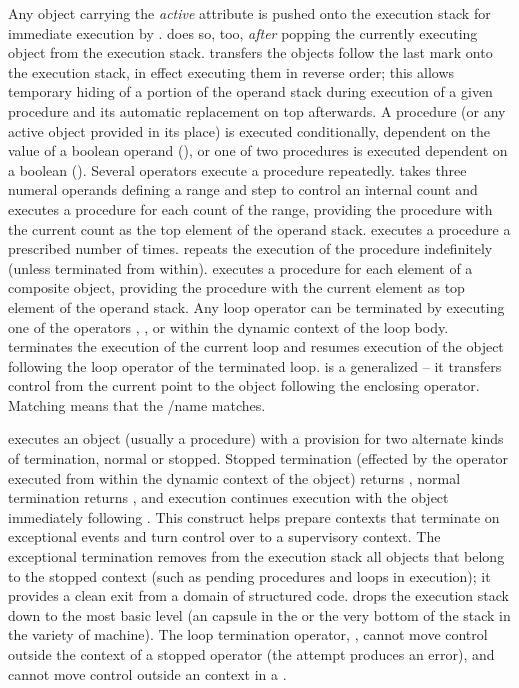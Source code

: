 Any object carrying the \emph{active} attribute is pushed onto the
execution stack for immediate execution by .  does
so, too, \emph{after} popping the currently executing object from the
execution stack.  transfers the objects follow the last mark
onto the execution stack, in effect executing them in reverse order;
this allows temporary hiding of a portion of the operand stack during
execution of a given procedure and its automatic replacement on top
afterwards. A procedure (or any active object provided in its place)
is executed conditionally, dependent on the value of a boolean operand
(), or one of two procedures is executed dependent on a boolean
(). Several operators execute a procedure
repeatedly.  takes three numeral operands defining a range and
step to control an internal count and executes a procedure for each
count of the range, providing the procedure with the current count as
the top element of the operand stack.  executes a procedure
a prescribed number of times.  repeats the execution of the
procedure indefinitely (unless terminated from within). 
executes a procedure for each element of a composite object, providing
the procedure with the current element as top element of the operand
stack. Any loop operator can be terminated by executing one of the
operators , , or  within the dynamic
context of the loop body.  terminates the execution of the
current loop and resumes execution of the object following the loop
operator of the terminated loop.  is a generalized
 -- it transfers control from the current point to the object
following the enclosing  operator. Matching means that
the /name matches.

 executes an object (usually a procedure) with a provision
for two alternate kinds of termination, normal or stopped. Stopped
termination (effected by the  operator executed from within
the dynamic context of the object) returns , normal
termination returns , and execution continues execution with
the object immediately following . This construct helps
prepare contexts that terminate on exceptional events and turn control
over to a supervisory context. The exceptional termination removes
from the execution stack all objects that belong to the stopped
context (such as pending procedures and loops in execution); it
provides a clean exit from a domain of structured code. 
drops the execution stack down to the most basic level (an
 capsule in the  or the very bottom of the
stack in the  variety of machine). The loop termination
operator, , cannot move control outside the context of a
stopped operator (the attempt produces an error), and  cannot
move control outside an  context in a .

